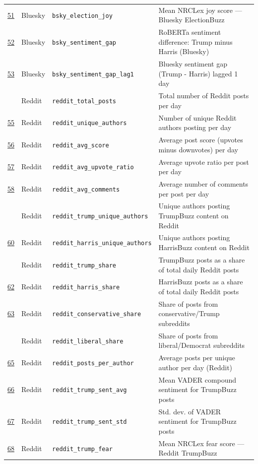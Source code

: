 \begin{longtable}{>{\centering\arraybackslash}p{0.9cm} p{2cm} p{4cm} p{7.5cm}}
\underline{51} & Bluesky & \texttt{bsky\_election\_joy} & Mean NRCLex joy score --- Bluesky ElectionBuzz \\
\underline{52} & Bluesky & \texttt{bsky\_sentiment\_gap} & RoBERTa sentiment difference: Trump minus Harris (Bluesky) \\
\underline{53} & Bluesky & \texttt{bsky\_sentiment\_gap\_lag1} & Bluesky sentiment gap (Trump - Harris) lagged 1 day \\
54 & Reddit & \texttt{reddit\_total\_posts} & Total number of Reddit posts per day \\
\underline{55} & Reddit & \texttt{reddit\_unique\_authors} & Number of unique Reddit authors posting per day \\
\underline{56} & Reddit & \texttt{reddit\_avg\_score} & Average post score (upvotes minus downvotes) per day \\
\underline{57} & Reddit & \texttt{reddit\_avg\_upvote\_ratio} & Average upvote ratio per post per day \\
\underline{58} & Reddit & \texttt{reddit\_avg\_comments} & Average number of comments per post per day \\
59 & Reddit & \texttt{reddit\_trump\_unique\_authors} & Unique authors posting TrumpBuzz content on Reddit \\
\underline{60} & Reddit & \texttt{reddit\_harris\_unique\_authors} & Unique authors posting HarrisBuzz content on Reddit \\
61 & Reddit & \texttt{reddit\_trump\_share} & TrumpBuzz posts as a share of total daily Reddit posts \\
\underline{62} & Reddit & \texttt{reddit\_harris\_share} & HarrisBuzz posts as a share of total daily Reddit posts \\
\underline{63} & Reddit & \texttt{reddit\_conservative\_share} & Share of posts from conservative/Trump subreddits \\
64 & Reddit & \texttt{reddit\_liberal\_share} & Share of posts from liberal/Democrat subreddits \\
\underline{65} & Reddit & \texttt{reddit\_posts\_per\_author} & Average posts per unique author per day (Reddit) \\
\underline{66} & Reddit & \texttt{reddit\_trump\_sent\_avg} & Mean VADER compound sentiment for TrumpBuzz posts \\
\underline{67} & Reddit & \texttt{reddit\_trump\_sent\_std} & Std. dev. of VADER sentiment for TrumpBuzz posts \\
\underline{68} & Reddit & \texttt{reddit\_trump\_fear} & Mean NRCLex fear score --- Reddit TrumpBuzz \\

\end{longtable}
